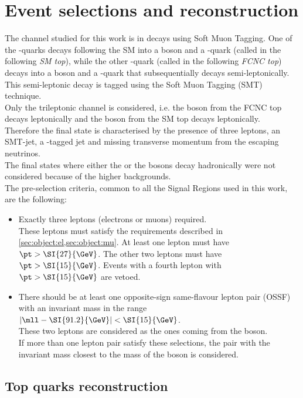 \section{Event selections and reconstruction}
\label{sec:selection}
The channel studied for this work is \FCNCtZc in \ttbar decays using Soft Muon Tagging.
One of the \Pqt-quarks decays following the SM into a \PW boson and a
\Pqb-quark (called in the following \textit{SM top}), while the other
\Pqt-quark (called in the following \textit{FCNC top}) decays into a \PZ
boson and a \Pqc-quark that subsequentially decays semi-leptonically.\\
This semi-leptonic decay is tagged using the Soft Muon Tagging (SMT) technique. \\
Only the trileptonic channel is considered, i.e. the \PZ boson from the
FCNC top decays leptonically and the \PW boson from the SM top
decays leptonically.\\
Therefore the final state is characterised by the presence of three leptons, an
SMT-jet, a \Pqb-tagged jet and missing transverse momentum from the
escaping neutrinos. \\
The final states where either the \PZ or the \PW bosons decay
hadronically were not considered because of the higher backgrounds.\\
The pre-selection criteria, common to all the Signal Regions used in this work, are the following:
\begin{itemize}
	\item    Exactly three leptons (electrons or muons) required. \\
				These leptons must satisfy the requirements described in
				\cref{sec:object:el,sec:object:mu}. 
				At least one lepton must have $\pt > \SI{27}{\GeV}$. 
				The other two leptons must have $\pt > \SI{15}{\GeV}$. 
				Events with a fourth lepton with $\pt > \SI{15}{\GeV}$ are vetoed. 
	\item   There should be at least one opposite-sign same-flavour lepton pair
				(OSSF) with an invariant mass in the range 
				$|\mll - \SI{91.2}{\GeV}| < \SI{15}{\GeV}$. \\
				These two leptons are considered as the ones coming from the \PZ boson.\\ 	
				If more than one lepton pair satisfy these selections, the pair
				with the invariant mass closest to the mass of the \PZ boson is
				considered. 
\end{itemize}	

\subsection {Top quarks reconstruction}

